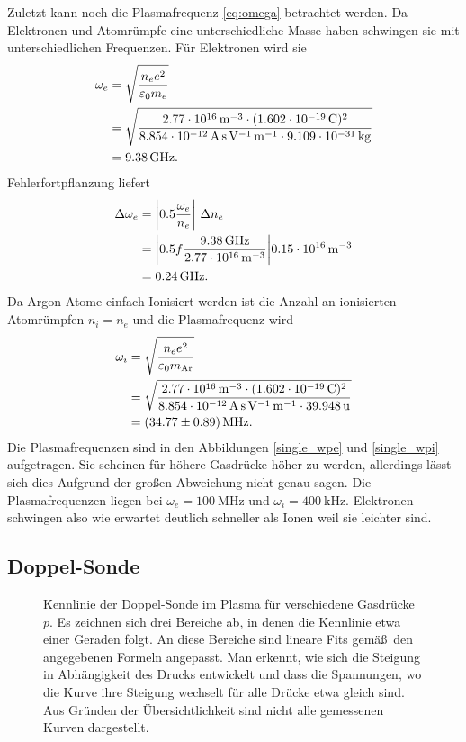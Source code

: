 Zuletzt kann noch die Plasmafrequenz \eqref{eq:omega} betrachtet werden.
Da Elektronen und Atomr\"umpfe eine unterschiedliche Masse haben schwingen sie mit unterschiedlichen Frequenzen.
F\"ur Elektronen wird sie
\begin{align}
\omega_e
    &=\sqrt{\frac{n_e e^2}{\varepsilon_0 m_e}}
    \label{swpe}\\
    &=\sqrt{\frac{\siAnea \cdot(\sie)^2}{\sieO\cdot\sime}}\nonumber\\
    &=\siAwpea .\nonumber
\end{align}
Fehlerfortpflanzung liefert
\begin{align}
\Delta \omega_e
    &=\abs{0.5\frac{\omega_e}{n_e}}\
    \Delta n_e\\
    &=\abs{0.5f\frac{\siAwpea}{\siAnea}}\sierrAnea\nonumber\\
    &=\sierrAwpea .\nonumber
\end{align}
Da Argon Atome einfach Ionisiert werden ist die Anzahl an ionisierten Atomr\"umpfen $n_i=n_e$ und die Plasmafrequenz wird
\begin{align}
\omega_i
    &=\sqrt{\frac{n_e e^2}{\varepsilon_0 m_\text{Ar}}}
    \label{swpe}\\
    &=\sqrt{\frac{\siAnea \cdot(\sie)^2}{\sieO\cdot\simAr}}\nonumber\\
    &=\sifullAwpia .\nonumber
\end{align}
Die Plasmafrequenzen sind in den Abbildungen \vref{single_wpe} und \vref{single_wpi} aufgetragen.
Sie scheinen f\"ur h\"ohere Gasdr\"ucke h\"oher zu werden, allerdings l\"asst sich dies Aufgrund der gro\ss en Abweichung nicht genau sagen.
Die Plasmafrequenzen liegen bei $\omega_e=\SI{100}{\mega\hertz}$ und $\omega_i=\SI{400}{\kilo\hertz}$.
Elektronen schwingen also wie erwartet deutlich schneller als Ionen weil sie leichter sind.

\FloatBarrier
\subsection{Doppel-Sonde}\label{double}
\begin{figure}[htbp]
    \centering
    
    \caption{
        Kennlinie der Doppel-Sonde im Plasma f\"ur verschiedene Gasdr\"ucke $p$.
        Es zeichnen sich drei Bereiche ab, in denen die Kennlinie etwa einer Geraden folgt.
        An diese Bereiche sind lineare Fits gem\"a\ss\ den angegebenen Formeln angepasst.
        Man erkennt, wie sich die Steigung in Abh\"angigkeit des Drucks entwickelt und dass die Spannungen, wo die Kurve ihre Steigung wechselt f\"ur alle Dr\"ucke etwa gleich sind.
        Aus Gr\"unden der \"Ubersichtlichkeit sind nicht alle gemessenen Kurven dargestellt.
    }
    \label{double_KL}
\end{figure}

